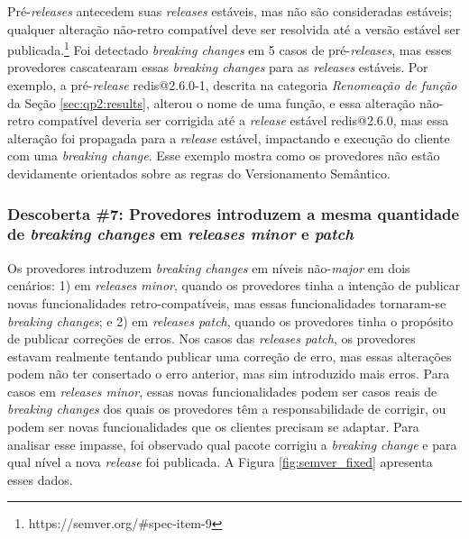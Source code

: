 Pré-\textit{releases} antecedem suas \textit{releases} estáveis, mas não são consideradas estáveis; qualquer alteração não-retro compatível deve ser resolvida até a versão estável ser publicada.\footnote{https://semver.org/\#spec-item-9} Foi detectado \textit{breaking changes} em 5 casos de pré-\textit{releases}, mas esses provedores cascatearam essas \textit{breaking changes} para as \textit{releases} estáveis. Por exemplo, a pré-\textit{release} \textsf{redis@2.6.0-1}, descrita na categoria \textit{Renomeação de função} da Seção \ref{sec:qp2:results}, alterou o nome de uma função, e essa alteração não-retro compatível deveria ser corrigida até a \textit{release} estável \textsf{redis@2.6.0}, mas essa alteração foi propagada para a \textit{release} estável, impactando e execução do cliente com uma \textit{breaking change}. Esse exemplo mostra como os provedores não estão devidamente orientados sobre as regras do Versionamento Semântico.

\subsubsection{Descoberta \#7: Provedores introduzem a mesma quantidade de \textit{breaking changes} em \textit{releases minor} e \textit{patch}}

Os provedores introduzem \textit{breaking changes} em níveis não-\textit{major} em dois cenários: 1) em \textit{releases minor}, quando os provedores tinha a intenção de publicar novas funcionalidades retro-compatíveis, mas essas funcionalidades tornaram-se \textit{breaking changes}; e 2) em \textit{releases patch}, quando os provedores tinha o propósito de publicar correções de erros. Nos casos das \textit{releases patch}, os provedores estavam realmente tentando publicar uma correção de erro, mas essas alterações podem não ter consertado o erro anterior, mas sim introduzido mais erros. Para casos em \textit{releases minor}, essas novas funcionalidades podem ser casos reais de \textit{breaking changes} dos quais os provedores têm a responsabilidade de corrigir, ou podem ser novas funcionalidades que os clientes precisam se adaptar. Para analisar esse impasse, foi observado qual pacote corrigiu a \textit{breaking change} e para qual nível a nova \textit{release} foi publicada. A Figura \ref{fig:semver_fixed} apresenta esses dados.

